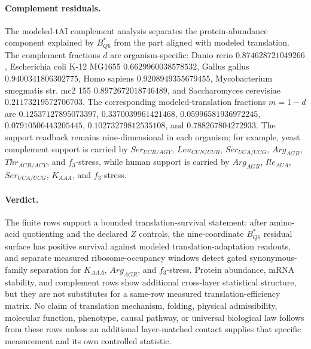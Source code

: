 \paragraph{Complement residuals.}
The modeled-tAI complement analysis separates the protein-abundance component explained by $B^{*}_{Q6}$ from the part aligned with modeled translation.  The complement fractions $d$ are organism-specific: Danio rerio $0.874628721049266$, Escherichia coli K-12 MG1655 $0.6629960038578532$, Gallus gallus $0.9400341806302775$, Homo sapiens $0.9208949355679455$, Mycobacterium smegmatis str. mc2 155 $0.8972672018746489$, and Saccharomyces cerevisiae $0.21173219572706703$.  The corresponding modeled-translation fractions $m=1-d$ are $0.12537127895073397$, $0.3370039961421468$, $0.05996581936972245$, $0.07910506443205445$, $0.10273279812535108$, and $0.788267804272933$.  The support readback remains nine-dimensional in each organism; for example, yeast complement support is carried by $Ser_{UCR/AGY}$, $Leu_{CUN/UUR}$, $Ser_{UCA/UCG}$, $Arg_{AGR}$, $Thr_{ACR/ACY}$, and $f_3$-stress, while human support is carried by $Arg_{AGR}$, $Ile_{AUA}$, $Ser_{UCA/UCG}$, $K_{AAA}$, and $f_3$-stress.

\paragraph{Verdict.}
The finite rows support a bounded translation-survival statement: after amino-acid quotienting and the declared $Z$ controls, the nine-coordinate $B^{*}_{Q6}$ residual surface has positive survival against modeled translation-adaptation readouts, and separate measured ribosome-occupancy windows detect gated synonymous-family separation for $K_{AAA}$, $Arg_{AGR}$, and $f_3$-stress.  Protein abundance, mRNA stability, and complement rows show additional cross-layer statistical structure, but they are not substitutes for a same-row measured translation-efficiency matrix.  No claim of translation mechanism, folding, physical admissibility, molecular function, phenotype, causal pathway, or universal biological law follows from these rows unless an additional layer-matched contact supplies that specific measurement and its own controlled statistic.
